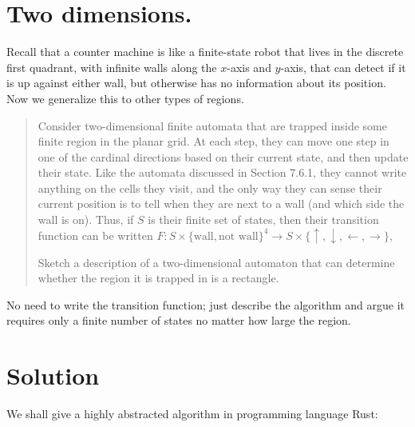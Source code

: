 
\newtheorem{theorem}{Theorem}

\maketitle
\thispagestyle{firststyle}
\vspace{-2.0cm}


\section{Two dimensions.}
    Recall that a counter machine is like a finite-state robot that lives in the discrete first quadrant, with infinite walls along the $x$-axis and $y$-axis,
    that can detect if it is up against either wall, but otherwise has no information about its position.
    Now we generalize this to other types of regions.
    \begin{quote}
    Consider two-dimensional finite automata that are trapped inside some finite region in the planar grid.
    At each step, they can move one step in one of the cardinal directions based on their current state, and then update their state.
    Like the automata discussed in Section 7.6.1, they cannot write anything on the cells they visit, and the only way they can sense their current position is to tell when they are next to a wall
    (and which side the wall is on).
    Thus, if $S$ is their finite set of states,
    then their transition function can be written $F: S \times \{\text{wall}, \text{not wall} \}^4 \to S \times \{\uparrow, \downarrow, \leftarrow, \rightarrow\}$,


    Sketch a description of a two-dimensional automaton that can determine
    whether the region it is trapped in is a rectangle.
    \end{quote}
    No need to write the transition function;
    just describe the algorithm and argue it requires only a finite number of states no matter how large the region.

\section*{Solution}

We shall give a highly abstracted algorithm in programming language Rust:

